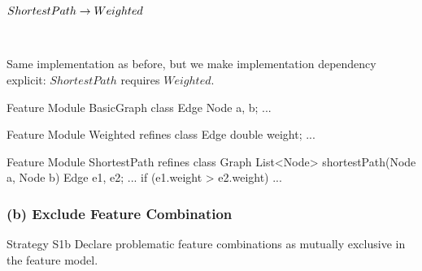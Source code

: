 \begin{frame}[fragile]{\myframetitle}
	\begin{mycolumns}[animation=none]
		\centering

		$ShortestPath \rightarrow Weighted$

		~
		\begin{note}{}
			Same implementation as before, but we make implementation dependency explicit: $ShortestPath$ requires $Weighted$.
		\end{note}
	\mynextcolumn
\begin{codetight}{Feature Module BasicGraph}
class Edge {
	Node a, b; ...
}
\end{codetight}	
\begin{codetight}{Feature Module Weighted}
refines class Edge {
	double weight; ...
}
\end{codetight}	
\begin{codetight}{Feature Module ShortestPath}
refines class Graph {
	List<Node> shortestPath(Node a, Node b){
		Edge e1, e2;
		...
		if (e1.weight > e2.weight)
		... 
	}
}
\end{codetight}	
	\end{mycolumns}
\end{frame}

\subsubsection*{(b) Exclude Feature Combination}
\begin{frame}{\myframetitle}
	\begin{mycolumns}[widths={30},animation=none]
		\begin{definition}{Strategy S1b}
			Declare problematic feature combinations as mutually exclusive in the feature model.
		\end{definition}
	\mynextcolumn
	\end{mycolumns}
\end{frame}

